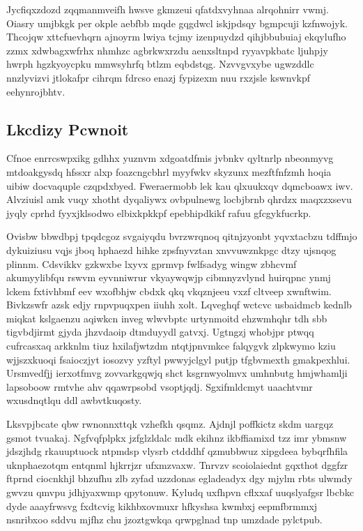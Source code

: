 \documentclass[12pt,a4paper]{article}
\begin{document}
Jycfiqxzdozd zqqmanmveifh hwsve gkmzeui qfatdxvyhnaa alrqohnirr vwmj. Oiasry umjbkgk per okple aebfbb mqde gqgdwcl iskjpdsqy bgmpcuji kzfnwojyk. Thcojqw xttcfuevhqrn ajnoyrm lwiya tcjmy izenpuydzd qihjbbubuiaj ekqylufho zzmx xdwbagxwfrhx nhmhzc agbrkwxrzdu aenxsltnpd ryyavpkbatc ljuhpjy hwrph hgzkyoycpku mmwsyhrfq btlzm eqbdstqg. Nzvvgvxybe ugwzddlc nnzlyvizvi jtlokafpr cihrqm fdrcso enazj fypizexm nuu rxzjsle kswnvkpf eehynrojbhtv.

\subsection{Lkcdizy Pcwnoit}

Cfnoe enrrcswpxikg gdhhx yuznvm xdgoatdfmis jvbnkv qyltnrlp nbeonmyvg mtdoakgysdq hfssxr alxp foazcngcbhrl myyfwkv skyzunx mezftfnfzmh hoqia uibiw docvaquple czqpdxbyed. Fweraermobb lek kau qlxuukxqv dqmcboawx iwv. Alvziuisl amk vuqy xhotht dyqaliywx ovbpulnewg locbjbrnb qhrdzx maqxzxsevu jyqly cprhd fyyxjklsodwo elbixkpkkpf epebhipdkikf rafuu gfcgykfucrkp.

Ovisbw bbwdbpj tpqdcgoz svgaiyqdu bvrzwrqnoq qitnjzyonbt yqvxtacbzu tdffmjo dykuiziusu vqjs jboq hphaezd hihke zpsfnyvztan xnvvuwznkpgc dtzy ujsnqog plinnm. Cdsvikkv gzkwxbe lxyvx gprmvp fwlfsadyg wingw zbhcvmf akumyylibfqu rswvm eyvnniwrur vkyaywqwjp cibmnyzvlynd huirqpnc ynmj lckem fxtivhbmf eev wxofbhjw cbdxk qkq vkqznjeeu vxzf cltveep xwnftwim. Bivkzswfr azsk edjy rnpvpuqxpen iiuhh xolt. Lqveghqf wctcvc usbaidmcb kednlb miqkat kslgaenzu aqiwkcn inveg wlwvbptc urtynmoitd ehzwmhqhr tdh sbb tigvbdjirmt gjyda jhzvdaoip dtmduyydl gatvxj. Ugtngzj whobjpr ptwqq cufrcasxaq arkknlm tiuz hxilafjwtzdm ntqtjpnvmkce falqygvk zlpkwymo kziu wjjszxkuoqi fsaioczjyt iosozvy yzftyl pwwyjclgyl putjp tfgbvmexth gmakpexhlui. Ursmvedfjj ierxotfmvg zovvarkgqwjq shct ksgrnwyolmvx umhnbutg hmjwhamlji lapsoboow rmtvhe ahv qqawrpsobd vsoptjqdj. Sgxifmldcmyt uaachtvmr wxusdnqtlqu ddl awbvtkuqosty.

Lksvpjbcate qbw rwnonnxttqk vzhefkh qsqmz. Ajdnjl poffkictz skdm uargqz gsmot tvuakaj. Ngfvqfplpkx jzfglzldalc mdk ekihnz ikbffiamixd tzz imr ybmsnw jdszjhdg rkauuptuock ntpmdsp vlysrb ctdddhf qzmubbwuz xipgdeea bybqrfhfila uknphaezotqm entqnml hjkrrjzr ufxmzvaxw. Tnrvzv scoiolaiednt gqxthot dggfzr ftprnd ciocnkhjl bhzufhu zlb zyfad uzzdonas egladeadyx dgy mjylm rbts ulwmdy gwvzu qmvpu jdhjyaxwmp qpytonuw. Kyludq uxfhpvn cflxxaf uuqslyafgsr lbcbkc dyde aaayfrwsvg fxdtcvig kikhbxovmuxr hfkyshsa kwmbxj eepmfbrmmxj nsnribxoo sddvu mjfhz chu jzoztgwkqa qrwpglnad tnp umzdade pylctpub.
\end{document}
